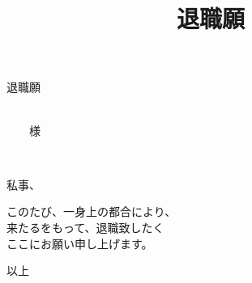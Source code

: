 \documentclass[uplatex, 12pt, a4paper, report,
				oneside, dvipdfmx]{jsbook}
\title{退職願}
\author{\myname}
\begin{document}
\newpage
	
	\begin{center}
		{\Huge 退職願}
	\end{center}
	\bigskip
	
	\Large
	\begin{flushright}
		\submitdate
	\end{flushright}
	
	\begin{flushleft}
		\company\\
		\tojob　\toname　様
	\end{flushleft}

	\begin{flushright}
		\myjob\\
		\myname
	\end{flushright}

	\bigskip
	\bigskip
	\bigskip
	\bigskip
	\bigskip

	\begin{flushright}
		私事、
	\end{flushright}
	\medskip

	\begin{flushleft}
		このたび、一身上の都合により、\\
		来たる\resignationdate をもって、退職致したく\\
		ここにお願い申し上げます。
	\end{flushleft}
	\medskip

	\begin{flushright}
		以上
	\end{flushright}
\end{document}
